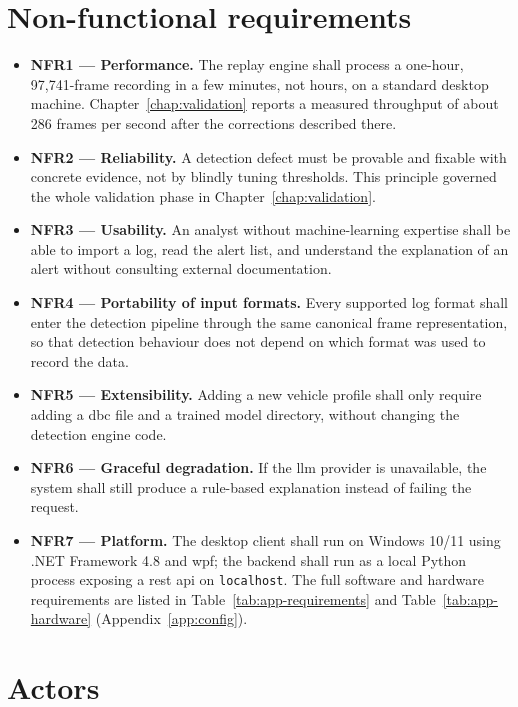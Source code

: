 \section{Non-functional requirements}

\begin{itemize}
    \item \textbf{NFR1 — Performance.} The replay engine shall process a one-hour, 97{,}741-frame recording in a few minutes, not hours, on a standard desktop machine. Chapter~\ref{chap:validation} reports a measured throughput of about 286 frames per second after the corrections described there.
    \item \textbf{NFR2 — Reliability.} A detection defect must be provable and fixable with concrete evidence, not by blindly tuning thresholds. This principle governed the whole validation phase in Chapter~\ref{chap:validation}.
    \item \textbf{NFR3 — Usability.} An analyst without machine-learning expertise shall be able to import a log, read the alert list, and understand the explanation of an alert without consulting external documentation.
    \item \textbf{NFR4 — Portability of input formats.} Every supported log format shall enter the detection pipeline through the same canonical frame representation, so that detection behaviour does not depend on which format was used to record the data.
    \item \textbf{NFR5 — Extensibility.} Adding a new vehicle profile shall only require adding a \gls{dbc} file and a trained model directory, without changing the detection engine code.
    \item \textbf{NFR6 — Graceful degradation.} If the \gls{llm} provider is unavailable, the system shall still produce a rule-based explanation instead of failing the request.
    \item \textbf{NFR7 — Platform.} The desktop client shall run on Windows 10/11 using .NET Framework 4.8 and \gls{wpf}; the backend shall run as a local Python process exposing a \gls{rest} \gls{api} on \texttt{localhost}. The full software and hardware requirements are listed in Table~\ref{tab:app-requirements} and Table~\ref{tab:app-hardware} (Appendix~\ref{app:config}).
\end{itemize}

\section{Actors}

